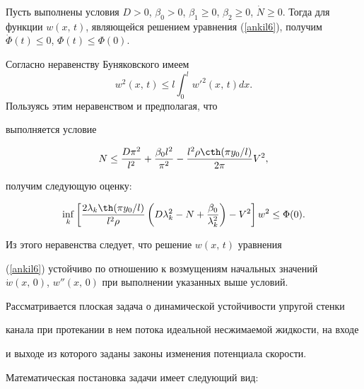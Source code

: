 Пусть выполнены условия $D > 0$, $\beta_0 > 0$, $\beta _1 \ge

0$, $\beta_2 \ge 0$, $\dot {N} \ge 0$. Тогда для функции $w (x,\,t)$, являющейся решением уравнения (\ref{ankil6}), получим $\dot {\Phi} (

t) \le 0$, $\Phi (t) \le \Phi (0)$.

Согласно неравенству Буняковского имеем $$w^2 (x,\,t) \le

l \int_0^l w'^2 (x,\,t)dx.$$ Пользуясь этим неравенством и предполагая, что

выполняется условие

$$

N \le \frac{D \pi ^2}{l^2} + \frac{\beta _0 l^2}{\pi ^2} -

\frac{l^2 \rho  \cth (\pi y_0 /l )}{2 \pi} V^2,

$$

получим следующую оценку:

$$

\mathop {\rm inf} \limits_k \left[ \frac{2 \lambda_k \th (\pi y_0 /l)}{l^2 \rho} \left( D\lambda _k^2 - N +

\frac{\beta _0 }{\lambda _k^2}\right) - V^2 \right]w^2 \le

\Phi (0).

$$

Из этого неравенства следует, что решение $w (x,\,t)$ уравнения

(\ref{ankil6}) устойчиво по отношению к возмущениям начальных значений $\dot

w (x,\,0)$, $w'' (x,\,0)$ при выполнении указанных выше условий.



\smallskip



 Рассматривается плоская задача о динамической устойчивости упругой стенки

канала при протекании в нем потока идеальной несжимаемой жидкости, на входе

и выходе из которого заданы законы изменения потенциала скорости.



Математическая постановка задачи имеет следующий вид:

